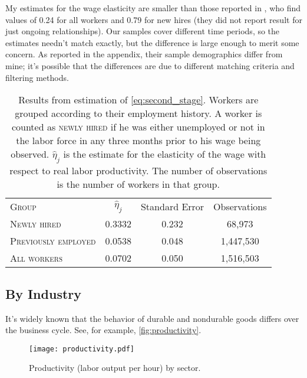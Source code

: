\documentclass[11pt]{article}
\begin{document}
My estimates for the wage elasticity are smaller than those reported in \cite{haefke_sonntag_vanRens_2013},  who find values of 0.24 for all workers and 0.79 for new hires (they did not report result for just ongoing relationships).
Our samples cover different time periods, so the estimates needn't match exactly, but the difference is large enough to merit some concern.
As reported in the appendix, their sample demographics differ from mine;
it's possible that the differences are due to different matching criteria and filtering methods.

\begin{table}
    \centering
    \begin{tabular}{lccc} \toprule
        \textsc{Group}               & $\hat{\eta}_j$ & Standard Error & Observations\\
        \textsc{Newly hired}         & 0.3332       & 0.232            & 68,973       \\
        \textsc{Previously employed} & 0.0538       & 0.048            & 1,447,530     \\
        \textsc{All workers}         & 0.0702       & 0.050            & 1,516,503     \\ \bottomrule
    \end{tabular}
    \caption{
                Results from estimation of \autoref{eq:second_stage}.
                Workers are grouped according to their employment history.
                A worker is counted as \textsc{newly hired} if he was either unemployed
                or not in the labor force in any three months prior to his wage
                being observed. $\hat{\eta}_j$ is the estimate for the elasticity of the wage with respect to real labor productivity.
                The number of observations is the number of workers in that group.
            }
    \label{tab:elasticity_estimates}
\end{table}


\subsection{By Industry}

It's widely known that the behavior of durable and nondurable goods differs over the business cycle.
See, for example, \autoref{fig:productivity}.

\begin{figure}
    \begin{center}
      \texttt{[image: productivity.pdf]}
    \end{center}
    \caption{
             Productivity (labor output per hour) by sector.
            }
    \label{fig:productivity}
\end{figure}
\end{document}
